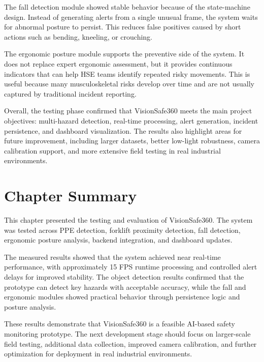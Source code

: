 The fall detection module showed stable behavior because of the state-machine design. Instead of generating alerts from a single unusual frame, the system waits for abnormal posture to persist. This reduces false positives caused by short actions such as bending, kneeling, or crouching.

The ergonomic posture module supports the preventive side of the system. It does not replace expert ergonomic assessment, but it provides continuous indicators that can help HSE teams identify repeated risky movements. This is useful because many musculoskeletal risks develop over time and are not usually captured by traditional incident reporting.

Overall, the testing phase confirmed that VisionSafe360 meets the main project objectives: multi-hazard detection, real-time processing, alert generation, incident persistence, and dashboard visualization. The results also highlight areas for future improvement, including larger datasets, better low-light robustness, camera calibration support, and more extensive field testing in real industrial environments.

\section{Chapter Summary}

This chapter presented the testing and evaluation of VisionSafe360. The system was tested across PPE detection, forklift proximity detection, fall detection, ergonomic posture analysis, backend integration, and dashboard updates.

The measured results showed that the system achieved near real-time performance, with approximately 15 FPS runtime processing and controlled alert delays for improved stability. The object detection results confirmed that the prototype can detect key hazards with acceptable accuracy, while the fall and ergonomic modules showed practical behavior through persistence logic and posture analysis.

These results demonstrate that VisionSafe360 is a feasible AI-based safety monitoring prototype. The next development stage should focus on larger-scale field testing, additional data collection, improved camera calibration, and further optimization for deployment in real industrial environments.
